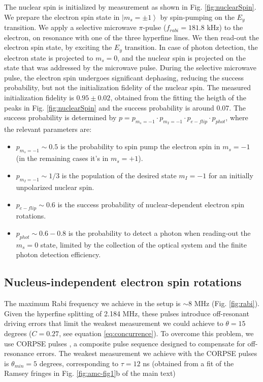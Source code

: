 The nuclear spin is initialized by measurement \cite{Pfaff_NatPhys_2012} as shown in Fig. \ref{fig:nuclearSpin}. We prepare the electron spin state in $\left| m_s=\pm 1 \right \rangle$ by spin-pumping on the $E_{y}$ transition. We apply a selective microwave $\pi$-pulse ($f_{rabi} = 181.8$ kHz) to the electron, on resonance with one of the three hyperfine lines. We then read-out the electron spin state, by exciting the $E_y$ transition. In case of photon detection, the electron state is projected to $m_s=0$, and the nuclear spin is projected on the state that was addressed by the microwave pulse.
During the selective microwave pulse, the electron spin undergoes significant dephasing, reducing the success probability, but not the initialization fidelity of the nuclear spin. The measured initialization fidelity is $0.95 \pm 0.02$, obtained from the fitting the heigth of the peaks in Fig. \ref{fig:nuclearSpin}  and the success probability is around $0.07$. The success probability is determined by $p = p_{m_s=-1} \cdot p_{m_I=-1} \cdot p_{e-flip} \cdot p_{phot}$, where the relevant parameters are:
\begin{itemize}
 \item $p_{m_s=-1} \sim 0.5$ is the probability to spin pump the electron spin in $m_s=-1$ (in the remaining cases it's in $m_s = +1$).
 \item $p_{m_I=-1} \sim 1/3$ is the population of the desired state $m_I=-1$ for an initially unpolarized nuclear spin.
 \item $p_{e-flip} \sim 0.6$ is the success probability of nuclear-dependent electron spin rotations.
 \item $ p_{phot} \sim 0.6-0.8$ is the probability to detect a photon when reading-out the $m_s=0$ state, limited by the collection of the optical system and the finite photon detection efficiency.
\end{itemize}


\subsection {Nucleus-independent electron spin rotations}

The maximum Rabi frequency we achieve in the setup is $\sim 8$ MHz (Fig. \ref{fig:rabi}). Given the hyperfine splitting of 2.184 MHz, these pulses introduce off-resonant driving errors that limit the weakest measurement we could achieve to $\theta = 15$ degrees ($C = 0.27$, see equation \ref{eq:concurrence}). To overcome this problem, we use CORPSE pulses \cite{Cummins_PRA_2003}, a composite pulse sequence designed to compensate for off-resonance errors. The weakest measurement we achieve with the CORPSE pulses is $\theta_{min} = 5$ degrees, corresponding to $\tau = 12$ ns (obtained from a fit of the Ramsey fringes in Fig. \ref{fig:amc-fig1}b of the main text)

